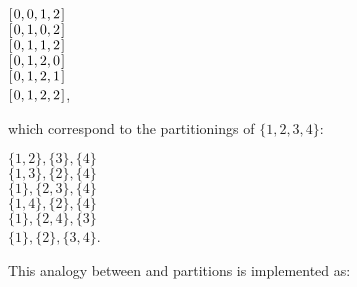 \documentclass{scrreprt}
\begin{document}
\ensuremath{[\mskip1.5mu \mathrm{0},\mathrm{0},\mathrm{1},\mathrm{2}\mskip1.5mu]}\\
\ensuremath{[\mskip1.5mu \mathrm{0},\mathrm{1},\mathrm{0},\mathrm{2}\mskip1.5mu]}\\
\ensuremath{[\mskip1.5mu \mathrm{0},\mathrm{1},\mathrm{1},\mathrm{2}\mskip1.5mu]}\\
\ensuremath{[\mskip1.5mu \mathrm{0},\mathrm{1},\mathrm{2},\mathrm{0}\mskip1.5mu]}\\
\ensuremath{[\mskip1.5mu \mathrm{0},\mathrm{1},\mathrm{2},\mathrm{1}\mskip1.5mu]}\\
\ensuremath{[\mskip1.5mu \mathrm{0},\mathrm{1},\mathrm{2},\mathrm{2}\mskip1.5mu]},

which correspond to the partitionings of $\lbrace 1,2,3,4\rbrace$:

$\lbrace 1,2\rbrace, \lbrace 3  \rbrace, \lbrace 4  \rbrace$\\
$\lbrace 1,3\rbrace, \lbrace 2  \rbrace, \lbrace 4  \rbrace$\\
$\lbrace 1  \rbrace, \lbrace 2,3\rbrace, \lbrace 4  \rbrace$\\
$\lbrace 1,4\rbrace, \lbrace 2  \rbrace, \lbrace 4  \rbrace$\\
$\lbrace 1  \rbrace, \lbrace 2,4\rbrace, \lbrace 3  \rbrace$\\
$\lbrace 1  \rbrace, \lbrace 2  \rbrace, \lbrace 3,4\rbrace$.

This analogy between  and partitions is implemented as:
\end{document}
